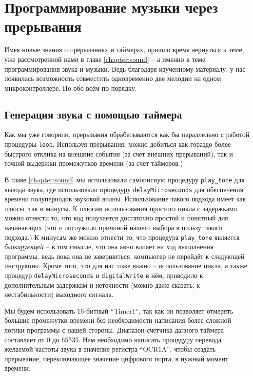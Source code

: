 \documentclass[../sparc.tex]{subfiles}
\begin{document}
\newpage
\section{Программирование музыки через прерывания}

Имея новые знания о прерываниях и таймерах, пришло время вернуться к теме, уже
рассмотренной нами в главе \ref{chapter:sound} -- а именно к теме
программирования звука и музыки.  Ведь благодаря изученному материалу, у нас
появилась возможность совместить одновременно две мелодии на одном
микроконтроллере.  Но обо всём по-порядку.

\subsection{Генерация звука с помощью таймера}

Как мы уже говорили, прерывания обрабатываются как бы параллельно с работой
процедуры \texttt{loop}.  Используя прерывания, можно добиться как
гораздо более быстрого отклика на внешние события (за счёт внешних прерываний),
так и точной выдержки промежутков времени (за счёт таймеров.)

В главе \ref{chapter:sound} мы использовали самописную процедуру
\texttt{play_tone} для вывода звука, где использовали процедуру
\texttt{delayMicroseconds} для обеспечения времени полупериодов
звуковой волны.  Использование такого подхода имеет как плюсы, так и минусы.  К
плюсам использования простого цикла с задержками можно отнести то, что код
получается достаточно простой и понятный для начинающих (это и послужило
причиной нашего выбора в пользу такого подхода.)  К минусам же можно отнести то,
что процедура \texttt{play_tone} является \emph{блокирующей} -- в том
смысле, что она явно влияет на ход выполнения программы, ведь пока она не
завершиться, компьютер не перейдёт к следующей инструкции.  Кроме того, что для
нас тоже важно -- использование цикла, а также процедур
\texttt{delayMicroseconds} и \texttt{digitalWrite} в нём,
приводило к дополнительным задержкам и неточности (можно даже сказать, к
нестабильности) выходного сигнала.

Мы будем использовать 16-битный ``Timer1'', так как он позволяет отмерять
большие промежутки времени без необходимости написания более сложной логики
программы с нашей стороны.  Диапазон счётчика данного таймера составляет от 0 до
65535.  Нам необходимо написать процедуру перевода желаемой частоты звука в
значение регистра ``OCR1A'', чтобы создать прерывание, переключающее значение
цифрового порта, в нужный момент времени.
\end{document}
